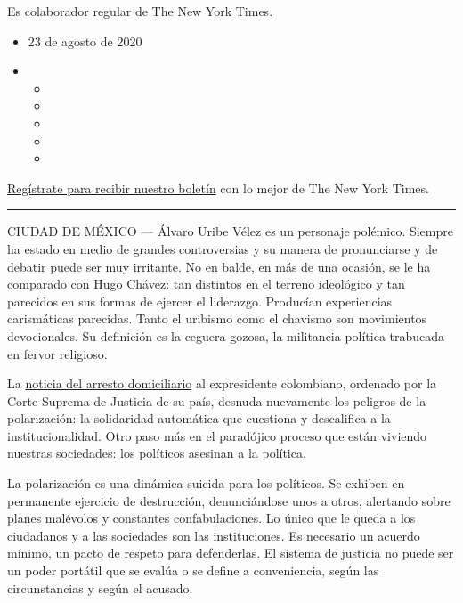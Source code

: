 Es colaborador regular de The New York Times.

\begin{itemize}
\item
  23 de agosto de 2020
\item
  \begin{itemize}
  \item
  \item
  \item
  \item
  \item
  \end{itemize}
\end{itemize}

\href{https://www.nytimes3xbfgragh.onion/newsletters/el-times}{Regístrate
para recibir nuestro boletín} con lo mejor de The New York Times.

\begin{center}\rule{0.5\linewidth}{\linethickness}\end{center}

CIUDAD DE MÉXICO --- Álvaro Uribe Vélez es un personaje polémico.
Siempre ha estado en medio de grandes controversias y su manera de
pronunciarse y de debatir puede ser muy irritante. No en balde, en más
de una ocasión, se le ha comparado con Hugo Chávez: tan distintos en el
terreno ideológico y tan parecidos en sus formas de ejercer el
liderazgo. Producían experiencias carismáticas parecidas. Tanto el
uribismo como el chavismo son movimientos devocionales. Su definición es
la ceguera gozosa, la militancia política trabucada en fervor religioso.

La
\href{https://www.nytimes3xbfgragh.onion/es/2020/08/04/espanol/america-latina/alvaro-uribe-detencion-colombia.html}{noticia
del arresto domiciliario} al expresidente colombiano, ordenado por la
Corte Suprema de Justicia de su país, desnuda nuevamente los peligros de
la polarización: la solidaridad automática que cuestiona y descalifica a
la institucionalidad. Otro paso más en el paradójico proceso que están
viviendo nuestras sociedades: los políticos asesinan a la política.

La polarización es una dinámica suicida para los políticos. Se exhiben
en permanente ejercicio de destrucción, denunciándose unos a otros,
alertando sobre planes malévolos y constantes confabulaciones. Lo único
que le queda a los ciudadanos y a las sociedades son las instituciones.
Es necesario un acuerdo mínimo, un pacto de respeto para defenderlas. El
sistema de justicia no puede ser un poder portátil que se evalúa o se
define a conveniencia, según las circunstancias y según el acusado.

